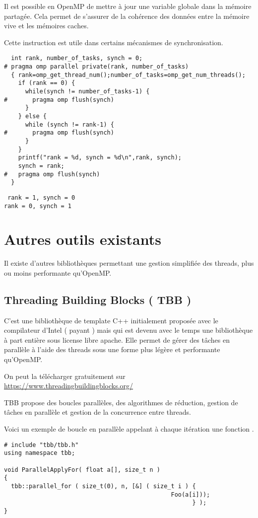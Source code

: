 \documentclass[fleqn,11pt]{article}
\begin{document}
Il est possible en OpenMP de mettre à jour une variable globale dans la mémoire
partagée. Cela permet de s'assurer de la cohérence des données entre la mémoire
vive et les mémoires caches.

Cette instruction est utile dans certains mécanismes de synchronisation.

\begin{lstlisting}
  int rank, number_of_tasks, synch = 0;
# pragma omp parallel private(rank, number_of_tasks)
  { rank=omp_get_thread_num();number_of_tasks=omp_get_num_threads();
    if (rank == 0) {
      while(synch != number_of_tasks-1) {
#       pragma omp flush(synch)
      }
    } else {
      while (synch != rank-1) {
#       pragma omp flush(synch)
      }
    }
    printf("rank = %d, synch = %d\n",rank, synch);
    synch = rank;
#   pragma omp flush(synch)
  }
\end{lstlisting}
\texttt{
rank = 1, synch = 0\\
rank = 0, synch = 1
}
  
\section{Autres outils existants}

Il existe d'autres bibliothèques permettant une gestion simplifiée des threads, plus ou moins
performante qu'OpenMP.

\subsection{Threading Building Blocks ( TBB )}

C'est une bibliothèque de template C++ initialement proposée avec le compilateur d'Intel
( payant ) mais qui est devenu avec le temps une bibliothèque à part entière sous
license libre apache. Elle permet de gérer des tâches en parallèle à l'aide des threads
sous une forme plus légère et performante qu'OpenMP.

On peut la télécharger gratuitement sur \url{https://www.threadingbuildingblocks.org/}

TBB propose des boucles parallèles, des algorithmes de réduction, gestion de tâches
en parallèle et gestion de la concurrence entre threads.

Voici un exemple de boucle en parallèle appelant à chaque itération une fonction \verb@Foo@.
\begin{lstlisting}
# include "tbb/tbb.h"
using namespace tbb;

void ParallelApplyFor( float a[], size_t n )
{
  tbb::parallel_for ( size_t(0), n, [&] ( size_t i ) {
                                               Foo(a[i]));
                                                     } );
}
\end{lstlisting}
\end{document}
